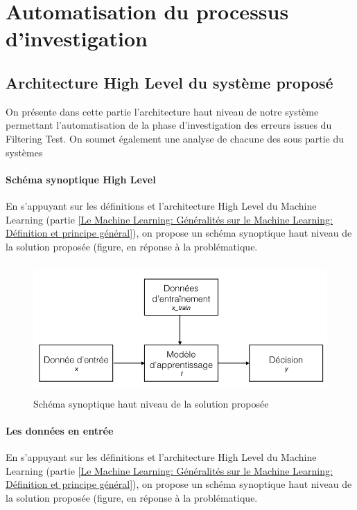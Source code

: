 \chapter{Automatisation du processus d'investigation}
\label{Automatisation du processus d'investigation}
\thispagestyle{fancy}


\section{Architecture High Level du système proposé}
\label{Automatisation du processus d'investigation: Achitecture High Level du système proposé}
On présente dans cette partie l'architecture haut niveau de notre système permettant l'automatisation de la phase d'investigation des erreurs issues du Filtering Test. On soumet également une analyse de chacune des sous partie du systèmes

\subsubsection{Schéma synoptique High Level}
\label{Automatisation du processus d'investigation: Achitecture High Level du système proposé: Schéma synoptique High Level}
En s'appuyant sur les définitions et l'architecture High Level du Machine Learning (partie \ref{Le Machine Learning: Généralités sur le Machine Learning: Définition et principe général}), on propose un schéma synoptique haut niveau de la solution proposée (figure, en réponse à la problématique. 

\begin{figure}[h]
	\centering\includegraphics[height=5cm]{images/ML_high_level.jpeg}
	\caption{Schéma synoptique haut niveau de la solution proposée}
	\label{fig:Schéma synoptique haut niveau de la solution proposée}
\end{figure}

\subsubsection{Les données en entrée}
\label{Automatisation du processus d'investigation: Achitecture High Level du système proposé: Schéma synoptique High Level}
En s'appuyant sur les définitions et l'architecture High Level du Machine Learning (partie \ref{Le Machine Learning: Généralités sur le Machine Learning: Définition et principe général}), on propose un schéma synoptique haut niveau de la solution proposée (figure, en réponse à la problématique. 


